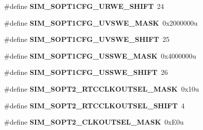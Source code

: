 \begin{DoxyCompactItemize}
\item 
\#define {\bfseries S\+I\+M\+\_\+\+S\+O\+P\+T1\+C\+F\+G\+\_\+\+U\+R\+W\+E\+\_\+\+S\+H\+I\+FT}~24\hypertarget{group__SIM__Register__Masks_ga07bf2ffc61aacca96748747fa8df7062}{}\label{group__SIM__Register__Masks_ga07bf2ffc61aacca96748747fa8df7062}

\item 
\#define {\bfseries S\+I\+M\+\_\+\+S\+O\+P\+T1\+C\+F\+G\+\_\+\+U\+V\+S\+W\+E\+\_\+\+M\+A\+SK}~0x2000000u\hypertarget{group__SIM__Register__Masks_ga29e593e134a31bed2dbd3673c51cb330}{}\label{group__SIM__Register__Masks_ga29e593e134a31bed2dbd3673c51cb330}

\item 
\#define {\bfseries S\+I\+M\+\_\+\+S\+O\+P\+T1\+C\+F\+G\+\_\+\+U\+V\+S\+W\+E\+\_\+\+S\+H\+I\+FT}~25\hypertarget{group__SIM__Register__Masks_ga74d94a9794e03091f54b76a5c18c58b8}{}\label{group__SIM__Register__Masks_ga74d94a9794e03091f54b76a5c18c58b8}

\item 
\#define {\bfseries S\+I\+M\+\_\+\+S\+O\+P\+T1\+C\+F\+G\+\_\+\+U\+S\+S\+W\+E\+\_\+\+M\+A\+SK}~0x4000000u\hypertarget{group__SIM__Register__Masks_ga0b7d9fe471d5d689ba3feb001cf69b60}{}\label{group__SIM__Register__Masks_ga0b7d9fe471d5d689ba3feb001cf69b60}

\item 
\#define {\bfseries S\+I\+M\+\_\+\+S\+O\+P\+T1\+C\+F\+G\+\_\+\+U\+S\+S\+W\+E\+\_\+\+S\+H\+I\+FT}~26\hypertarget{group__SIM__Register__Masks_ga6984c7260abd4b7caccff970332eb4be}{}\label{group__SIM__Register__Masks_ga6984c7260abd4b7caccff970332eb4be}

\item 
\#define {\bfseries S\+I\+M\+\_\+\+S\+O\+P\+T2\+\_\+\+R\+T\+C\+C\+L\+K\+O\+U\+T\+S\+E\+L\+\_\+\+M\+A\+SK}~0x10u\hypertarget{group__SIM__Register__Masks_ga4ecc21f62a92e94e5f507a6bb5e44062}{}\label{group__SIM__Register__Masks_ga4ecc21f62a92e94e5f507a6bb5e44062}

\item 
\#define {\bfseries S\+I\+M\+\_\+\+S\+O\+P\+T2\+\_\+\+R\+T\+C\+C\+L\+K\+O\+U\+T\+S\+E\+L\+\_\+\+S\+H\+I\+FT}~4\hypertarget{group__SIM__Register__Masks_gaa4b7f7e8f1999ec0d56a1224cf7eb35d}{}\label{group__SIM__Register__Masks_gaa4b7f7e8f1999ec0d56a1224cf7eb35d}

\item 
\#define {\bfseries S\+I\+M\+\_\+\+S\+O\+P\+T2\+\_\+\+C\+L\+K\+O\+U\+T\+S\+E\+L\+\_\+\+M\+A\+SK}~0x\+E0u\hypertarget{group__SIM__Register__Masks_ga601bb7007f58e3ad5433d3538f4dcef0}{}\label{group__SIM__Register__Masks_ga601bb7007f58e3ad5433d3538f4dcef0}


\end{DoxyCompactItemize}

